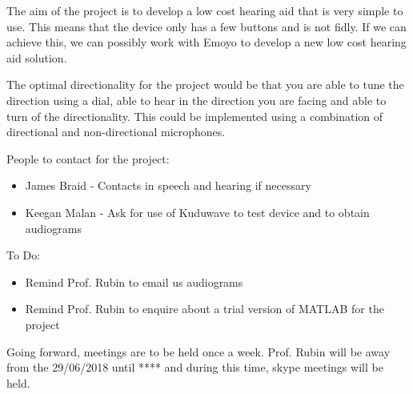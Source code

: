 \documentclass[10pt,onecolumn]{witseiepaper}
\begin{document}
The aim of the project is to develop a low cost hearing aid that is very simple to use. This means that the device only has a few buttons and is not fidly. If we can achieve this, we can possibly work with Emoyo to develop a new low cost hearing aid solution.

The optimal directionality for the project would be that you are able to tune the direction using a dial, able to hear in the direction you are facing and able to turn of the directionality. This could be implemented using a combination of directional and non-directional microphones.

People to contact for the project:
\begin{itemize}
	\item James Braid - Contacts in speech and hearing if necessary
	\item Keegan Malan - Ask for use of Kuduwave to test device and to obtain audiograms
\end{itemize}

To Do:
\begin{itemize}
	\item Remind Prof. Rubin to email us audiograms
	\item Remind Prof. Rubin to enquire about a trial version of MATLAB for the project
\end{itemize}

Going forward, meetings are to be held once a week. Prof. Rubin will be away from the 29/06/2018 until **** and during this time, skype meetings will be held.
\end{document}
